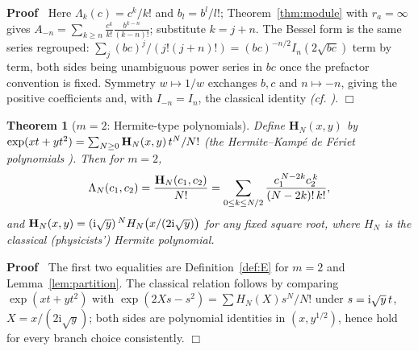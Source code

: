 \documentclass{article}
\newcommand{\tmem}[1]{{\em #1\/}}
\newenvironment{proof}{\noindent\textbf{Proof\ }}{\hspace*{\fill}$\Box$\medskip}
\newtheorem{theorem}{Theorem}
\begin{document}
\begin{proof}
  Here $\Lambda_k (c) = c^k / k$! and $b_l = b^l / l$!;
  Theorem~\ref{thm:module} with $r_a = \infty$ gives $A_{- n} = \sum_{k \ge n}
  \frac{c^k}{k!}  \frac{b^{k - n}}{(k - n) !}$; substitute $k = j + n$. The
  Bessel form is the same series regrouped: $\sum_j (bc)^j / (j! (j + n) !) =
  (bc)^{- n / 2} I_n  (2 \sqrt{bc})$ term by term, both sides being
  unambiguous power series in $bc$ once the prefactor convention is fixed.
  Symmetry $w \mapsto 1 / w$ exchanges $b, c$ and $n \mapsto - n$, giving the
  positive coefficients and, with $I_{- n} = I_n$, the classical identity
  {\tmem{(cf. {\cite[10.35.1]{DLMF}})}}.
\end{proof}

\begin{theorem}
  [$m = 2$: Hermite-type polynomials]\label{thm:hermite} Define $\mathbf{H}_N
  (x, y)$ by $\exp (xt + yt^2) = \sum_{N \ge 0} \mathbf{H}_N (x, y) 
  \hspace{0.17em} t^N / N!$ {\tmem{(the Hermite--Kamp{\'e} de F{\'e}riet
  polynomials {\cite{Appell}})}}. Then for $m = 2$,
  \[ \Lambda_N  (c_1, c_2) = \frac{\mathbf{H}_N (c_1, c_2)}{N!} = \sum_{0 \le
     k \le N / 2} \frac{c_1^{\hspace{0.17em} N - 2 k} c_2^{\hspace{0.17em}
     k}}{(N - 2 k) ! \hspace{0.17em} k!}, \]
  and $\mathbf{H}_N (x, y) = (\mathrm{i} \sqrt{y})^{\hspace{0.17em} N} H_N 
  \hspace{-0.17em} \left( x / (2 \mathrm{i} \sqrt{y}) \right)$ for any fixed
  square root, where $H_N$ is the classical (physicists') Hermite polynomial.
\end{theorem}

\begin{proof}
  The first two equalities are Definition~\ref{def:E} for $m = 2$ and
  Lemma~\ref{lem:partition}. The classical relation follows by comparing $\exp
  (xt + yt^2)$ with $\exp (2 Xs - s^2) = \sum H_N (X) s^N / N!$ under $s =
  \mathrm{i} \sqrt{y}  \hspace{0.17em} t$, $X = x / (2 \mathrm{i} \sqrt{y})$;
  both sides are polynomial identities in $(x, y^{1 / 2})$, hence hold for
  every branch choice consistently.
\end{proof}
\end{document}
